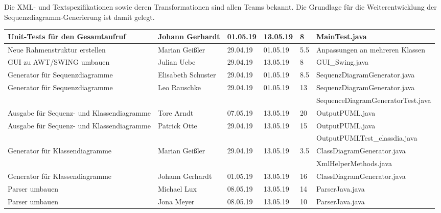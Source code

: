 Die XML- und Textspezifikationen sowie deren Transformationen sind allen Teams bekannt. Die Grundlage für die Weiterentwicklung der Sequenzdiagramm-Generierung ist damit gelegt.
\nsecend

\begin{longtable}{|p{4cm}|l|l|l|l|l|}
        \hline
        Unit-Tests für den Gesamtaufruf & Johann Gerhardt & 01.05.19 & 13.05.19 & 8 & MainTest.java\\
        \hline
        Neue Rahmenstruktur erstellen & Marian Geißler & 29.04.19 & 01.05.19 & 5.5 & Anpassungen an mehreren Klassen\\ 
        \hline
        GUI zu AWT/SWING umbauen & Julian Uebe & 29.04.19 & 13.05.19 & 8 & GUI\_Swing.java\\
		\hline
        Generator für Sequenzdiagramme & Elisabeth Schuster & 29.04.19 & 01.05.19 & 8.5 & SequenzDiagramGenerator.java\\
        \hline
        Generator für Sequenzdiagramme & Leo Rauschke & 29.04.19 & 01.05.19 & 13 & SequenzDiagramGenerator.java\\
        \hline
        & & & & & SequenceDiagramGeneratorTest.java\\
        \hline
        Ausgabe für Sequenz- und Klassendiagramme & Tore Arndt & 07.05.19 & 13.05.19 & 20 & OutputPUML.java\\
        \hline
    	Ausgabe für Sequenz- und Klassendiagramme & Patrick Otte & 29.04.19 & 13.05.19 & 15 & OutputPUML.java\\
    	\hline
    	& & & & & OutputPUMLTest\_classdia.java\\
        \hline
        Generator für Klassendiagramme & Marian Geißler & 29.04.19 & 13.05.19 & 3.5 & ClassDiagramGenerator.java\\
        \hline
        & & & & & XmlHelperMethods.java\\
        \hline
        Generator für Klassendiagramme & Johann Gerhardt & 01.05.19 & 13.05.19 & 16 & ClassDiagramGenerator.java\\
        \hline
        Parser umbauen & Michael Lux & 08.05.19 & 13.05.19 & 14 & ParserJava.java\\
        \hline
        Parser umbauen & Jona Meyer & 08.05.19 & 13.05.19 & 10 & ParserJava.java\\
\hline
\end{longtable}     
\nsecend

